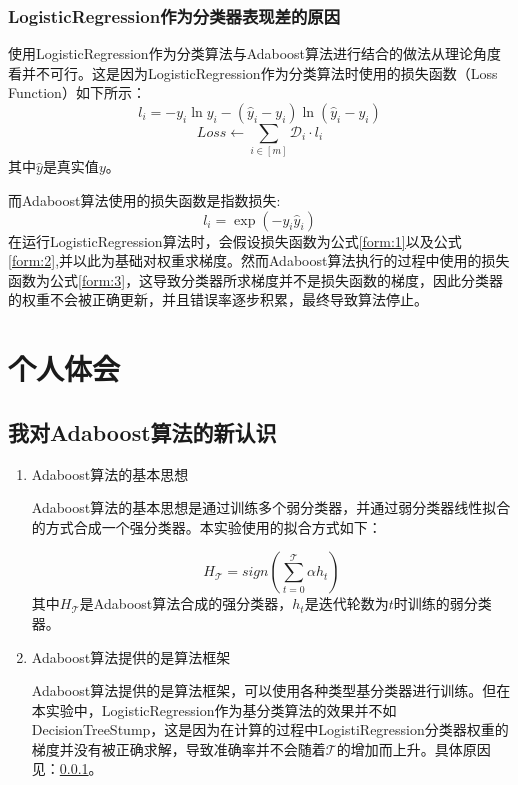 \documentclass{paper}
\begin{document}
\subsubsection{LogisticRegression作为分类器表现差的原因} \label{reason}

使用LogisticRegression作为分类算法与Adaboost算法进行结合的做法从理论角度看并不可行。这是因为LogisticRegression作为分类算法时使用的损失函数（Loss Function）如下所示：
\begin{equation} \label{form:1}
    l_i = -y_i\ln{y}_i-(\hat{y}_i-y_i)\ln{(\hat{y}_i-y_i)}
\end{equation}
\begin{equation} \label{form:2}
    Loss \leftarrow \sum_{i \in [m]}{\mathcal{D}_i \cdot l_i}
\end{equation}
其中$\hat{y}$是真实值$y$。

而Adaboost算法使用的损失函数是指数损失:
\begin{equation} \label{form:3}
    l_i = \exp{(-y_i \hat{y}_i)}
\end{equation}
在运行LogisticRegression算法时，会假设损失函数为公式\ref{form:1}以及公式\ref{form:2},并以此为基础对权重求梯度。然而Adaboost算法执行的过程中使用的损失函数为公式\ref{form:3}，这导致分类器所求梯度并不是损失函数的梯度，因此分类器的权重不会被正确更新，并且错误率逐步积累，最终导致算法停止。

\section{个人体会}

\subsection{我对Adaboost算法的新认识}

\begin{enumerate}
    \item Adaboost算法的基本思想
    
            Adaboost算法的基本思想是通过训练多个弱分类器，并通过弱分类器线性拟合的方式合成一个强分类器。本实验使用的拟合方式如下：

            \begin{equation}
                H_{\mathcal{T}} = sign(\sum_{t=0}^{\mathcal{T}} \alpha h_t)
            \end{equation}
            其中$H_{\mathcal{T}}$是Adaboost算法合成的强分类器，$h_t$是迭代轮数为$t$时训练的弱分类器。

    \item Adaboost算法提供的是算法框架
    
            Adaboost算法提供的是算法框架，可以使用各种类型基分类器进行训练。但在本实验中，LogisticRegression作为基分类算法的效果并不如DecisionTreeStump，这是因为在计算的过程中LogistiRegression分类器权重的梯度并没有被正确求解，导致准确率并不会随着$\mathcal{T}$的增加而上升。具体原因见：\ref{reason}。
\end{enumerate}
\end{document}
